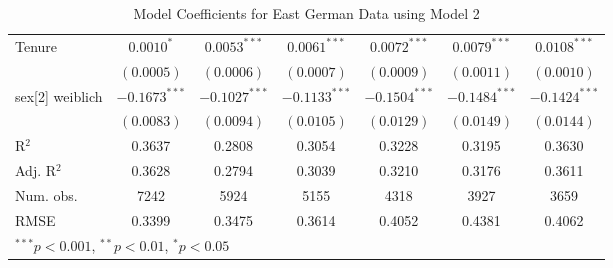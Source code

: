 \begin{table}
\begin{center}
\begin{small}
\begin{tabular}{l c c c c c c }
Tenure          & $0.0010^{*}$    & $0.0053^{***}$  & $0.0061^{***}$  & $0.0072^{***}$  & $0.0079^{***}$  & $0.0108^{***}$  \\
                & $(0.0005)$      & $(0.0006)$      & $(0.0007)$      & $(0.0009)$      & $(0.0011)$      & $(0.0010)$      \\
sex[2] weiblich & $-0.1673^{***}$ & $-0.1027^{***}$ & $-0.1133^{***}$ & $-0.1504^{***}$ & $-0.1484^{***}$ & $-0.1424^{***}$ \\
                & $(0.0083)$      & $(0.0094)$      & $(0.0105)$      & $(0.0129)$      & $(0.0149)$      & $(0.0144)$      \\
\hline
R$^2$           & 0.3637          & 0.2808          & 0.3054          & 0.3228          & 0.3195          & 0.3630          \\
Adj. R$^2$      & 0.3628          & 0.2794          & 0.3039          & 0.3210          & 0.3176          & 0.3611          \\
Num. obs.       & 7242            & 5924            & 5155            & 4318            & 3927            & 3659            \\
RMSE            & 0.3399          & 0.3475          & 0.3614          & 0.4052          & 0.4381          & 0.4062          \\
\hline
\multicolumn{7}{l}{\tiny{$^{***}p<0.001$, $^{**}p<0.01$, $^*p<0.05$}}
\end{tabular}
\end{small}
\caption{Model Coefficients for East German Data using Model 2}
\label{table:EastModelsOldNew}
\end{center}
\end{table}
